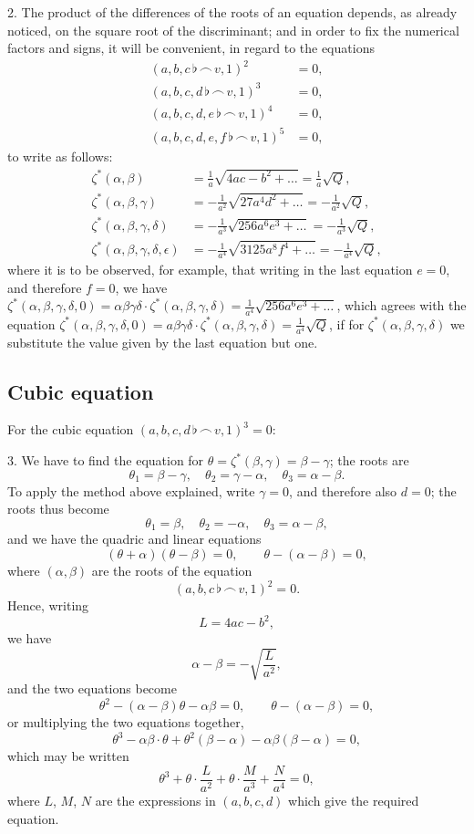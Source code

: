 \documentclass[11pt,a4paper]{book}
\begin{document}
2. The product of the differences of the roots of an equation depends, as already noticed, on the square root of the discriminant; and in order to fix the numerical factors and signs, it will be convenient, in regard to the equations
\begin{align*}
(a,b,c\,\flat\,\frown\, v,1)^2 &= 0,\\
(a,b,c,d\,\flat\,\frown\, v,1)^3 &= 0,\\
(a,b,c,d,e\,\flat\,\frown\, v,1)^4 &= 0,\\
(a,b,c,d,e,f\,\flat\,\frown\, v,1)^5 &= 0,
\end{align*}
to write as follows:
\begin{align*}
\zeta^*(\alpha,\beta) &= \frac{1}{a}\sqrt{4ac-b^2+\ldots}=\frac{1}{a}\sqrt{Q},\\
\zeta^*(\alpha,\beta,\gamma) &= -\frac{1}{a^2}\sqrt{27a^4d^2+\ldots}=-\frac{1}{a^2}\sqrt{Q},\\
\zeta^*(\alpha,\beta,\gamma,\delta) &= -\frac{1}{a^3}\sqrt{256a^6e^3+\ldots}=-\frac{1}{a^3}\sqrt{Q},\\
\zeta^*(\alpha,\beta,\gamma,\delta,\epsilon) &= -\frac{1}{a^4}\sqrt{3125a^8f^4+\ldots}=-\frac{1}{a^4}\sqrt{Q},
\end{align*}
where it is to be observed, for example, that writing in the last equation $e=0$, and therefore $f=0$, we have $\zeta^*(\alpha,\beta,\gamma,\delta,0)=\alpha\beta\gamma\delta\cdot\zeta^*(\alpha,\beta,\gamma,\delta)=\frac{1}{a^4}\sqrt{256a^6e^3+\ldots}$, which agrees with the equation $\zeta^*(\alpha,\beta,\gamma,\delta,0)=a\beta\gamma\delta\cdot\zeta^*(\alpha,\beta,\gamma,\delta)=\frac{1}{a^4}\sqrt{Q}$, if for $\zeta^*(\alpha,\beta,\gamma,\delta)$ we substitute the value given by the last equation but one.

\subsection*{Cubic equation}

For the cubic equation $(a,b,c,d\,\flat\,\frown\, v,1)^3=0$:

3. We have to find the equation for $\theta=\zeta^*(\beta,\gamma)=\beta-\gamma$; the roots are
\[
\theta_1=\beta-\gamma,\quad \theta_2=\gamma-\alpha,\quad \theta_3=\alpha-\beta.
\]
To apply the method above explained, write $\gamma=0$, and therefore also $d=0$; the roots thus become
\[
\theta_1=\beta,\quad \theta_2=-\alpha,\quad \theta_3=\alpha-\beta,
\]
and we have the quadric and linear equations
\[
(\theta+\alpha)(\theta-\beta)=0,\qquad \theta-(\alpha-\beta)=0,
\]
where $(\alpha,\beta)$ are the roots of the equation
\[
(a,b,c\,\flat\,\frown\, v,1)^2=0.
\]
Hence, writing
\[
L=4ac-b^2,
\]
we have
\[
\alpha-\beta=-\sqrt{\frac{L}{a^2}},
\]
and the two equations become
\[
\theta^2-(\alpha-\beta)\theta-\alpha\beta=0,\qquad \theta-(\alpha-\beta)=0,
\]
or multiplying the two equations together,
\[
\theta^3-\alpha\beta\cdot\theta+\theta^2(\beta-\alpha)-\alpha\beta(\beta-\alpha)=0,
\]
which may be written
\[
\theta^3+\theta\cdot\frac{L}{a^2}+\theta\cdot\frac{M}{a^3}+\frac{N}{a^4}=0,
\]
where $L$, $M$, $N$ are the expressions in $(a,b,c,d)$ which give the required equation.
\end{document}
